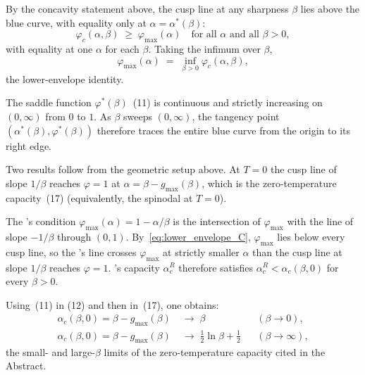 \documentclass[letterpaper]{article} %
\newcommand{\Bnet}{\beta}
\newcommand{\ac}{\alpha_c}
\begin{document}
By the concavity statement above, the cusp line at any sharpness $\Bnet$ lies above the blue curve, with equality only at
$\alpha = \alpha^*(\Bnet)$:
\begin{equation}
\varphi_c(\alpha, \Bnet) \;\ge\; \varphi_{\max}(\alpha) \quad \text{for all $\alpha$ and all $\Bnet > 0$},
\tag{49}
\end{equation}
with equality at one $\alpha$ for each $\Bnet$. Taking the infimum over $\Bnet$,
\begin{equation}
\varphi_{\max}(\alpha) \;=\; \inf_{\Bnet > 0} \varphi_c(\alpha, \Bnet),
\tag{50}
\label{eq:lower_envelope_C}
\end{equation}
the lower-envelope identity.

The saddle function $\varphi^*(\Bnet)$~(11) is
continuous and strictly increasing on $(0, \infty)$ from $0$ to $1$. As $\Bnet$ sweeps $(0, \infty)$,
the tangency point $(\alpha^*(\Bnet), \varphi^*(\Bnet))$ therefore traces the
entire blue curve from the origin to its right edge.

Two results follow from the geometric setup above.  At $T = 0$ the
cusp line of slope $1/\Bnet$ reaches $\varphi = 1$ at
$\alpha = \Bnet - g_{\max}(\Bnet)$, which is the zero-temperature
capacity~(17) (equivalently, the spinodal at
$T = 0$).

The \citet{ramsauer2021hopfield}'s condition
$\varphi_{\max}(\alpha) = 1 - \alpha/\Bnet$ is the intersection of
$\varphi_{\max}$ with the line of slope $-1/\Bnet$ through $(0, 1)$.
By~\eqref{eq:lower_envelope_C}, $\varphi_{\max}$ lies below every
cusp line, so the \citeauthor{ramsauer2021hopfield}'s line crosses $\varphi_{\max}$ at strictly
smaller $\alpha$ than the cusp line at slope $1/\Bnet$ reaches
$\varphi = 1$.  \citeauthor{ramsauer2021hopfield}'s capacity $\alpha_c^R$ therefore satisfies
$\alpha_c^R < \alpha_c(\Bnet, 0)$ for every $\Bnet > 0$.

Using~(11) in
(12) and then in~(17), one obtains:
\begin{equation}
\begin{aligned}
\ac(\Bnet, 0) = \Bnet - g_{\max}(\Bnet) &\;\to\; \Bnet
   && (\Bnet \to 0),\\
\ac(\Bnet, 0) = \Bnet - g_{\max}(\Bnet) &\;\to\; \tfrac{1}{2}\ln\Bnet + \tfrac{1}{2}
   && (\Bnet \to \infty),
\end{aligned}
\tag{51}
\label{eq:asymptotic_C}
\end{equation}
the small- and large-$\Bnet$ limits of the zero-temperature capacity
cited in the Abstract.
\end{document}
